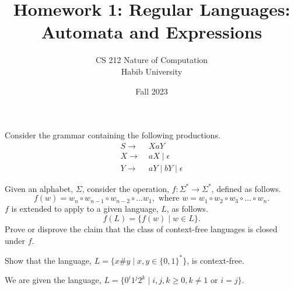\documentclass[addpoints]{exam}
\title{Homework 1: Regular Languages: Automata and Expressions}
\author{CS 212 Nature of Computation\\Habib University}
\date{Fall 2023}
\begin{document}
\maketitle

\begin{questions}
  
\question Consider the grammar containing the following productions.
\begin{align*} 
  S \to &\; XaY\\
  X \to &\; aX \mid \epsilon\\
  Y \to &\; aY \mid bY \mid \epsilon
\end{align*}


\question[5] Given an alphabet, $\Sigma$, consider the operation, $f:\Sigma^*\to\Sigma^*$, defined as follows.
  \[
f(w) = w_n\circ w_{n-1}\circ w_{n-2}\circ\ldots w_{1}, \text{ where } w = w_1\circ w_2\circ w_3\circ\ldots\circ w_n.
  \]
  $f$ is extended to apply to a given language, $L$, as follows.
  \[
    f(L) = \{ f(w) \mid w\in L \}.
  \]
  Prove or disprove the claim that the class of context-free languages is closed under $f$.
  
\question[5] Show that the language, $L=\{ x\#y \mid x,y\in\{0,1\}^*\}$, is context-free.

\question We are given the language, $L = \{0^i1^j2^k \mid i,j,k \geq 0, k \neq 1 \text{ or } i = j\}$.
\end{questions}
\end{document}
